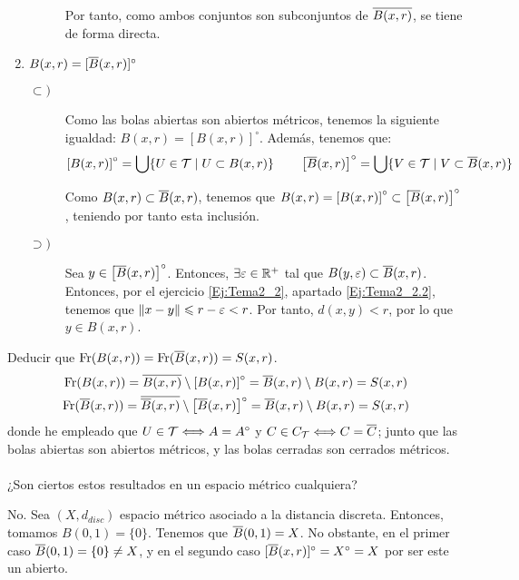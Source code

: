 \begin{ejercicio}
\begin{enumerate}
\begin{description}
            Por tanto, como ambos conjuntos son subconjuntos de $\overline{B(x,r)}$, se tiene de forma directa.
        \end{description}
        
        \item $B(x,r) = [\overline{B}(x,r)]^\circ$
        \begin{description}
            \item[$\subset)$] Como las bolas abiertas son abiertos métricos, tenemos la siguiente igualdad: $B(x,r)=\left[B(x,r)\right]^\circ$. Además, tenemos que:
            \begin{equation*}
                \left[B(x,r)\right]^\circ = \bigcup\{U\in \mathcal{T}\mid U\subset B(x,r)\}
                \qquad
                \left[\overline{B}(x,r)\right]^\circ = \bigcup\{V\in \mathcal{T}\mid V\subset \overline{B}(x,r)\}
            \end{equation*}

            Como $B(x,r)\subset \overline{B}(x,r)$, tenemos que $B(x,r)=\left[B(x,r)\right]^\circ\subset \left[\overline{B}(x,r)\right]^\circ$, teniendo por tanto esta inclusión.

            \item[$\supset)$] Sea $y\in \left[\overline{B}(x,r)\right]^\circ$. Entonces, $\exists \varepsilon\in \mathbb{R}^+$ tal que $B(y,\varepsilon)\subset \overline{B}(x,r)$. Entonces, por el ejercicio \ref{Ej:Tema2_2}, apartado \ref{Ej:Tema2_2.2}, tenemos que $\|x-y\|\leqslant r-\varepsilon<r$. Por tanto, $d(x,y)<r$, por lo que $y\in B(x,r)$.
        \end{description}
    \end{enumerate}

    Deducir que $\operatorname{Fr}(B(x,r)) = \operatorname{Fr}(\overline{B}(x,r)) = S(x, r)$.
    \begin{gather*}
        \operatorname{Fr}(B(x,r)) = \overline{B(x,r)}\setminus \left[B(x,r)\right]^\circ = \overline{B}(x,r)\setminus B(x,r) = S(x,r) \\
        \operatorname{Fr}(\overline{B}(x,r)) = \overline{\overline{B}(x,r)}\setminus \left[\overline{B}(x,r)\right]^\circ = \overline{B}(x,r)\setminus B(x,r) = S(x,r)
    \end{gather*}
    donde he empleado que $U\in \mathcal{T}\Longleftrightarrow A=A^\circ$ y $C\in C_{\mathcal{T}}\Longleftrightarrow C=\overline{C}$; junto que las bolas abiertas son abiertos métricos, y las bolas cerradas son cerrados métricos.\\ \ \\
    
    ¿Son ciertos estos resultados en un espacio métrico cualquiera?

    No. Sea $(X,d_{disc})$ espacio métrico asociado a la distancia discreta. Entonces, tomamos $B(0,1)=\{0\}$. Tenemos que $\overline{B}(0,1)=X$. No obstante, en el primer caso $\overline{B}(0,1)=\{0\}\neq X$, y en el segundo caso $[\overline{B}(x,r)]^\circ = X^\circ = X$ por ser este un abierto.
\end{ejercicio}

